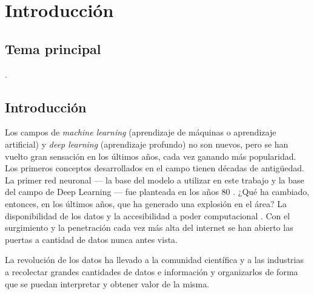 
\chapter{Introducción} %

\label{Chapter1} %


\newcommand{\keyword}[1]{\textbf{#1}}
\newcommand{\tabhead}[1]{\textbf{#1}}
\newcommand{\code}[1]{\texttt{#1}}
\newcommand{\file}[1]{\texttt{\bfseries#1}}
\newcommand{\option}[1]{\texttt{\itshape#1}}


\section{Tema principal}

\ttitle.



\section{Introducción}

Los campos de \emph{\gls{machine learning}} (aprendizaje de máquinas o aprendizaje artificial) y \textit{\gls{deep learning}} (\gls{aprendizaje profundo}) \parencite{lecun2015deep} no son nuevos, pero se han vuelto gran sensación en los últimos años, cada vez ganando más popularidad. Los primeros conceptos desarrollados en el campo tienen décadas de antigüedad. La primer \gls{red neuronal} --- la base del modelo a utilizar en este trabajo y la base del campo de Deep Learning --- fue planteada en los años 80 \parencite{werbos1982applications}. ¿Qué ha cambiado, entonces, en los últimos años, que ha generado una explosión en el área? La disponibilidad de los datos y la accesibilidad a poder computacional \parencite{jordan2015machine}. Con el surgimiento y la penetración cada vez más alta del internet se han abierto las puertas a cantidad de datos nunca antes vista.

La revolución de los datos ha llevado a la comunidad científica y a las industrias a recolectar grandes cantidades de datos e información y organizarlos de forma que se puedan interpretar y obtener valor de la misma.

